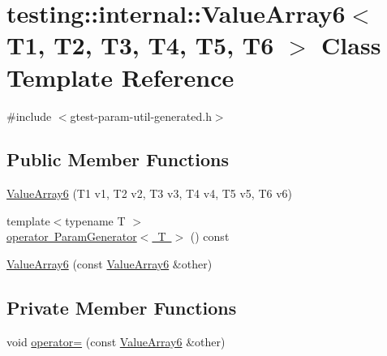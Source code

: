 \hypertarget{classtesting_1_1internal_1_1_value_array6}{}\section{testing\+::internal\+::Value\+Array6$<$ T1, T2, T3, T4, T5, T6 $>$ Class Template Reference}
\label{classtesting_1_1internal_1_1_value_array6}


{\ttfamily \#include $<$gtest-\/param-\/util-\/generated.\+h$>$}

\subsection*{Public Member Functions}
\begin{DoxyCompactItemize}
\item 
\mbox{\hyperlink{classtesting_1_1internal_1_1_value_array6_ad1c323929591d89807220281ceb6d4d5}{Value\+Array6}} (T1 v1, T2 v2, T3 v3, T4 v4, T5 v5, T6 v6)
\item 
{\footnotesize template$<$typename T $>$ }\\\mbox{\hyperlink{classtesting_1_1internal_1_1_value_array6_ab6cb557146bca7cf5fcfa40f10dee9da}{operator Param\+Generator$<$ T $>$}} () const
\item 
\mbox{\hyperlink{classtesting_1_1internal_1_1_value_array6_a270702109b4185c6749310902fed7456}{Value\+Array6}} (const \mbox{\hyperlink{classtesting_1_1internal_1_1_value_array6}{Value\+Array6}} \&other)
\end{DoxyCompactItemize}
\subsection*{Private Member Functions}
\begin{DoxyCompactItemize}
\item 
void \mbox{\hyperlink{classtesting_1_1internal_1_1_value_array6_a4f242827b4ceb40049f6584bb6cbbe28}{operator=}} (const \mbox{\hyperlink{classtesting_1_1internal_1_1_value_array6}{Value\+Array6}} \&other)
\end{DoxyCompactItemize}
